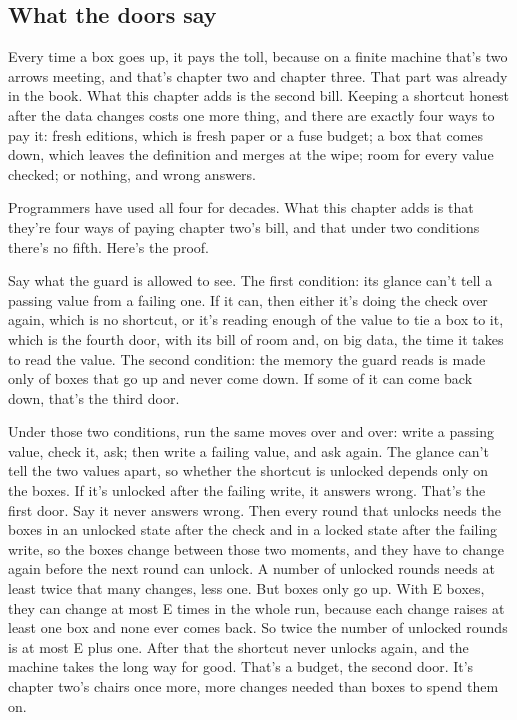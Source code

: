 \documentclass[11pt,twoside]{article}
\theoremstyle{thielethm}
\theoremstyle{thieledef}
\theoremstyle{thieledef}
\theoremstyle{thieledef}
\theoremstyle{thielethm}
\theoremstyle{thieleobs}
\theoremstyle{thielethm}
\begin{document}
\subsection{What the doors say}

Every time a box goes up, it pays the toll, because on a finite machine that's two arrows meeting, and that's chapter two and chapter three. That part was already in the book. What this chapter adds is the second bill. Keeping a shortcut honest after the data changes costs one more thing, and there are exactly four ways to pay it: fresh editions, which is fresh paper or a fuse budget; a box that comes down, which leaves the definition and merges at the wipe; room for every value checked; or nothing, and wrong answers.

Programmers have used all four for decades. What this chapter adds is that they're four ways of paying chapter two's bill, and that under two conditions there's no fifth. Here's the proof.

Say what the guard is allowed to see. The first condition: its glance can't tell a passing value from a failing one. If it can, then either it's doing the check over again, which is no shortcut, or it's reading enough of the value to tie a box to it, which is the fourth door, with its bill of room and, on big data, the time it takes to read the value. The second condition: the memory the guard reads is made only of boxes that go up and never come down. If some of it can come back down, that's the third door.

Under those two conditions, run the same moves over and over: write a passing value, check it, ask; then write a failing value, and ask again. The glance can't tell the two values apart, so whether the shortcut is unlocked depends only on the boxes. If it's unlocked after the failing write, it answers wrong. That's the first door. Say it never answers wrong. Then every round that unlocks needs the boxes in an unlocked state after the check and in a locked state after the failing write, so the boxes change between those two moments, and they have to change again before the next round can unlock. A number of unlocked rounds needs at least twice that many changes, less one. But boxes only go up. With E boxes, they can change at most E times in the whole run, because each change raises at least one box and none ever comes back. So twice the number of unlocked rounds is at most E plus one. After that the shortcut never unlocks again, and the machine takes the long way for good. That's a budget, the second door. It's chapter two's chairs once more, more changes needed than boxes to spend them on.
\end{document}
